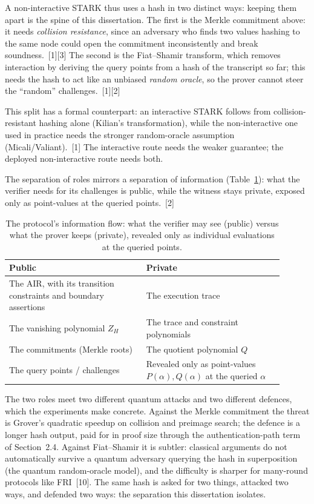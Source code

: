 \documentclass[11pt]{article}
\begin{document}
A non-interactive STARK thus uses a hash in two distinct ways: keeping them apart is the spine of
this dissertation. The first is the Merkle commitment above: it needs \emph{collision resistance}, since
an adversary who finds two values hashing to the same node could open the commitment inconsistently and
break soundness.~[1][3] The second is the Fiat--Shamir transform, which removes interaction by deriving
the query points from a hash of the transcript so far; this needs the hash to act like an unbiased
\emph{random oracle}, so the prover cannot steer the ``random'' challenges.~[1][2]

This split has a formal counterpart: an interactive STARK follows from collision-resistant hashing alone
(Kilian's transformation), while the non-interactive one used in practice needs the stronger
random-oracle assumption (Micali/Valiant).~[1] The interactive route needs the weaker guarantee; the
deployed non-interactive route needs both.

The separation of roles mirrors a separation of information (Table~\ref{tab:t4}): what the verifier needs
for its challenges is public, while the witness stays private, exposed only as point-values at the
queried points.~[2]

\begin{table}[htbp]\centering\footnotesize
\caption{The protocol's information flow: what the verifier may see (public) versus what the prover
keeps (private), revealed only as individual evaluations at the queried points.}
\label{tab:t4}
\begin{tabular}{p{0.45\linewidth} p{0.45\linewidth}}
\toprule
Public & Private \\
\midrule
The AIR, with its transition constraints and boundary assertions & The execution trace \\
The vanishing polynomial $Z_H$            & The trace and constraint polynomials \\
The commitments (Merkle roots)            & The quotient polynomial $Q$ \\
The query points / challenges             & Revealed only as point-values $P(\alpha),Q(\alpha)$ at the queried $\alpha$ \\
\bottomrule
\end{tabular}
\end{table}

The two roles meet two different quantum attacks and two different defences, which the experiments
make concrete. Against the Merkle commitment the threat is Grover's quadratic speedup on collision and
preimage search; the defence is a longer hash output, paid for in proof size through the
authentication-path term of Section~2.4. Against Fiat--Shamir it is subtler: classical arguments do not
automatically survive a quantum adversary querying the hash in superposition (the quantum random-oracle
model), and the difficulty is sharper for many-round protocols like FRI~[10]. The same hash is asked for
two things, attacked two ways, and defended two ways: the separation this dissertation isolates.
\end{document}
